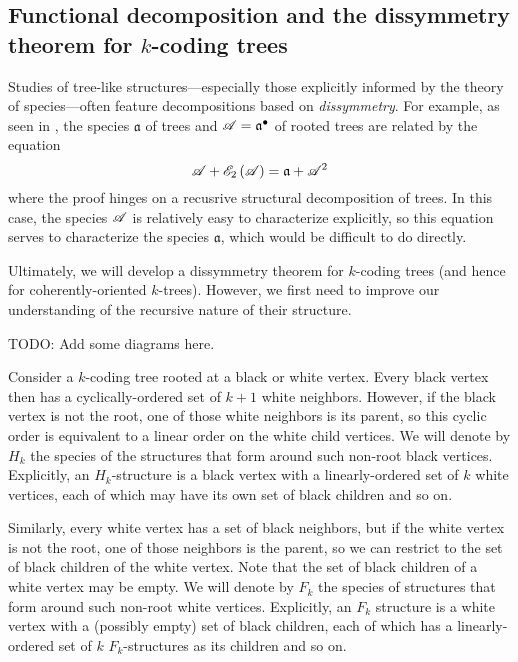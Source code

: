 \documentclass[sectionflow,singlespace,twoside,boldmathhdr]{brandiss} %
\numberwithin{section}{chapter}
\numberwithin{figure}{chapter}
\begin{document}
\subsection{Functional decomposition and the dissymmetry theorem for $k$-coding trees}\label{ss:codecomp}
Studies of tree-like structures---especially those explicitly informed by the theory of species---often feature decompositions based on \emph{dissymmetry}.
For example, as seen in \cite[\S 4.1]{bll:species}, the species $\mathfrak{a}$ of trees and $\mathscr{A} = {\mathfrak{a}}^{\bullet }$ of rooted trees are related by the equation
\begin{equation*}
  \mathscr{A} + \mathscr{E}_{2} \left( {\mathscr{A}} \right) = \mathfrak{a} + \mathscr{A}^{2}
\end{equation*}
where the proof hinges on a recusrive structural decomposition of trees.
In this case, the species $\mathscr{A}$ is relatively easy to characterize explicitly, so this equation serves to characterize the species $\mathfrak{a}$, which would be difficult to do directly.

Ultimately, we will develop a dissymmetry theorem for $k$-coding trees (and hence for coherently-oriented $k$-trees).
However, we first need to improve our understanding of the recursive nature of their structure.

TODO: Add some diagrams here.

Consider a $k$-coding tree rooted at a black or white vertex.
Every black vertex then has a cyclically-ordered set of $k+1$ white neighbors.
However, if the black vertex is not the root, one of those white neighbors is its parent, so this cyclic order is equivalent to a linear order on the white child vertices.
We will denote by $H_{k}$ the species of the structures that form around such non-root black vertices.
Explicitly, an $H_{k}$-structure is a black vertex with a linearly-ordered set of $k$ white vertices, each of which may have its own set of black children and so on.

Similarly, every white vertex has a set of black neighbors, but if the white vertex is not the root, one of those neighbors is the parent, so we can restrict to the set of black children of the white vertex.
Note that the set of black children of a white vertex may be empty.
We will denote by $F_{k}$ the species of structures that form around such non-root white vertices.
Explicitly, an $F_{k}$ structure is a white vertex with a (possibly empty) set of black children, each of which has a linearly-ordered set of $k$ $F_{k}$-structures as its children and so on.
\end{document}
